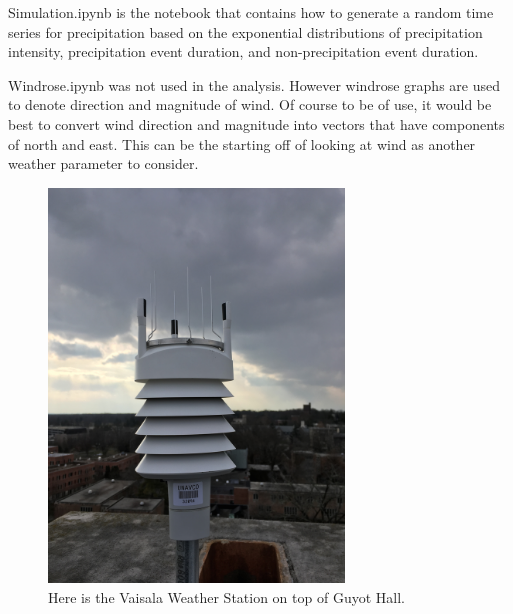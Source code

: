 \documentclass[11pt]{report}
\begin{document}
Simulation.ipynb is the notebook that contains how to generate a random time series for precipitation based on the exponential distributions of precipitation intensity, precipitation event duration, and non-precipitation event duration. 

Windrose.ipynb was not used in the analysis. However windrose graphs are used to denote direction and magnitude of wind. Of course to be of use, it would be best to convert wind direction and magnitude into vectors that have components of north and east. This can be the starting off of looking at wind as another weather parameter to consider. 

\begin{figure}[h]
	\centering
	\includegraphics[width = 0.7\textwidth]{Figures/weather_station.jpg}
	\caption[Vaisala Weather Station]{
		Here is the Vaisala Weather Station on top of Guyot Hall.  
		 }
\end{figure}
\end{document}
